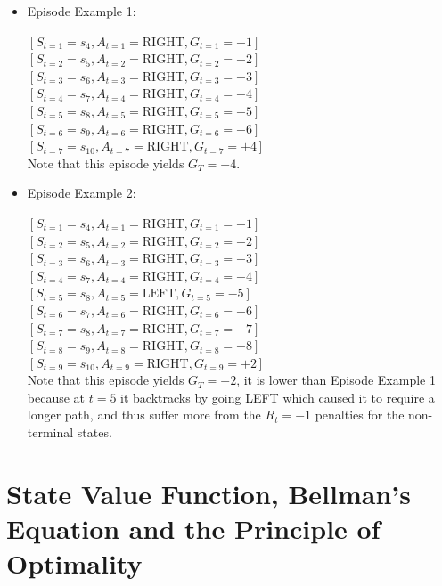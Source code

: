 \documentclass[a4paper,11pt]{article}
\begin{document}
\begin{itemize}
  \item Episode Example 1:
  
  $[S_{t=1} = s_4, A_{t=1} = \text{RIGHT}, G_{t=1}=-1]$ \\
  $[S_{t=2} = s_5, A_{t=2} = \text{RIGHT}, G_{t=2}=-2]$ \\
  $[S_{t=3} = s_6, A_{t=3} = \text{RIGHT}, G_{t=3}=-3]$ \\
  $[S_{t=4} = s_7, A_{t=4} = \text{RIGHT}, G_{t=4}=-4]$ \\
  $[S_{t=5} = s_8, A_{t=5} = \text{RIGHT}, G_{t=5}=-5]$ \\
  $[S_{t=6} = s_9, A_{t=6} = \text{RIGHT}, G_{t=6}=-6]$ \\
  $[S_{t=7} = s_10, A_{t=7} = \text{RIGHT}, G_{t=7}=+4]$ \\

  Note that this episode yields $G_T = +4$.

  \item Episode Example 2:
  
  $[S_{t=1} = s_4, A_{t=1} = \text{RIGHT}, G_{t=1}=-1]$ \\
  $[S_{t=2} = s_5, A_{t=2} = \text{RIGHT}, G_{t=2}=-2]$ \\
  $[S_{t=3} = s_6, A_{t=3} = \text{RIGHT}, G_{t=3}=-3]$ \\
  $[S_{t=4} = s_7, A_{t=4} = \text{RIGHT}, G_{t=4}=-4]$ \\
  $[S_{t=5} = s_8, A_{t=5} = \text{LEFT}, G_{t=5}=-5]$ \\
  $[S_{t=6} = s_7, A_{t=6} = \text{RIGHT}, G_{t=6}=-6]$ \\
  $[S_{t=7} = s_8, A_{t=7} = \text{RIGHT}, G_{t=7}=-7]$ \\
  $[S_{t=8} = s_9, A_{t=8} = \text{RIGHT}, G_{t=8}=-8]$ \\
  $[S_{t=9} = s_10, A_{t=9} = \text{RIGHT}, G_{t=9}=+2]$ \\
  
  Note that this episode yields $G_T = +2$, it is lower than Episode Example 1 because at $t=5$ it backtracks by going LEFT which caused it to require a longer path, and thus suffer more from the $R_t = -1$ penalties for the non-terminal states.
\end{itemize}

\section{State Value Function, Bellman's Equation and the Principle of Optimality}
\end{document}
